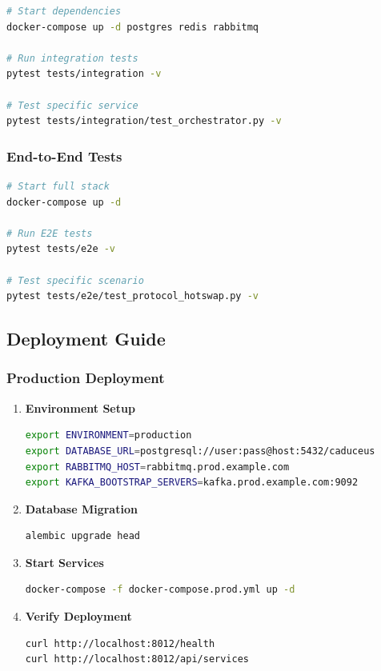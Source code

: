 \documentclass[10pt,a4paper]{article}
\begin{document}
\begin{lstlisting}[language=bash, caption=Running Integration Tests]
# Start dependencies
docker-compose up -d postgres redis rabbitmq

# Run integration tests
pytest tests/integration -v

# Test specific service
pytest tests/integration/test_orchestrator.py -v
\end{lstlisting}

\subsubsection{End-to-End Tests}

\begin{lstlisting}[language=bash, caption=Running E2E Tests]
# Start full stack
docker-compose up -d

# Run E2E tests
pytest tests/e2e -v

# Test specific scenario
pytest tests/e2e/test_protocol_hotswap.py -v
\end{lstlisting}

\subsection{Deployment Guide}

\subsubsection{Production Deployment}

\begin{enumerate}
\item \textbf{Environment Setup}
\begin{lstlisting}[language=bash]
export ENVIRONMENT=production
export DATABASE_URL=postgresql://user:pass@host:5432/caduceus
export RABBITMQ_HOST=rabbitmq.prod.example.com
export KAFKA_BOOTSTRAP_SERVERS=kafka.prod.example.com:9092
\end{lstlisting}

\item \textbf{Database Migration}
\begin{lstlisting}[language=bash]
alembic upgrade head
\end{lstlisting}

\item \textbf{Start Services}
\begin{lstlisting}[language=bash]
docker-compose -f docker-compose.prod.yml up -d
\end{lstlisting}

\item \textbf{Verify Deployment}
\begin{lstlisting}[language=bash]
curl http://localhost:8012/health
curl http://localhost:8012/api/services
\end{lstlisting}
\end{enumerate}
\end{document}
